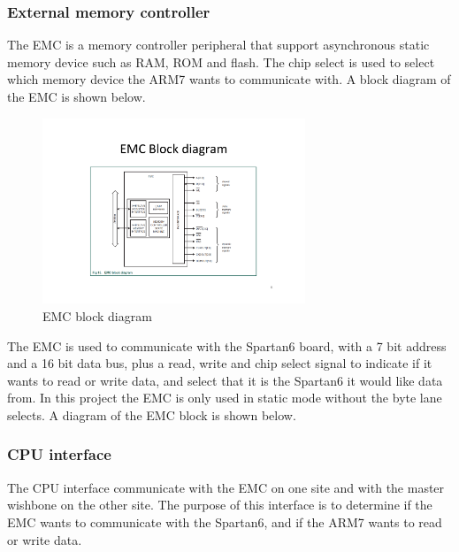 \subsubsection{External memory controller}
The EMC is a memory controller peripheral that support asynchronous static memory device such as RAM, ROM and flash. The chip select is used to select which memory device the ARM7 wants to communicate with. A block diagram of the EMC is shown below.
\begin{figure}[H]
	\begin{centering}
		 \includegraphics[width=0.7\textwidth]{content/appendix/eudp/images/emb_block_diagram.pdf}
		\caption{EMC block diagram}
	\end{centering}
\end{figure}
The EMC is used to communicate with the Spartan6 board, with a 7 bit address and a 16 bit data bus, plus a read, write and chip select signal to indicate if it wants to read or write data, and select that it is the Spartan6 it would like data from. In this project the EMC is only used in static mode without the byte lane selects. A diagram of the EMC block is shown below.
\subsubsection{CPU interface}
The CPU interface communicate with the EMC on one site and with the master wishbone on the other site. The purpose of this interface is to determine if the EMC wants to communicate with the Spartan6, and if the ARM7 wants to read or write data.


